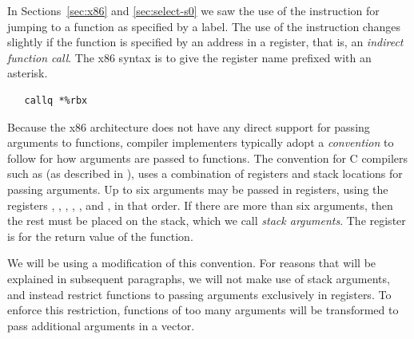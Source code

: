 \documentclass[11pt]{book}
\begin{document}
In Sections~\ref{sec:x86} and \ref{sec:select-s0} we saw the use of
the  instruction for jumping to a function as specified by
a label. The use of the instruction changes slightly if the function
is specified by an address in a register, that is, an \emph{indirect
  function call}. The x86 syntax is to give the register name prefixed
with an asterisk.
\begin{lstlisting}
   callq *%rbx
\end{lstlisting}

Because the x86 architecture does not have any direct support for
passing arguments to functions, compiler implementers typically adopt
a \emph{convention} to follow for how arguments are passed to
functions. The convention for C compilers such as  (as
described in \cite{Matz:2013aa}), uses a combination of registers and
stack locations for passing arguments. Up to six arguments may be
passed in registers, using the registers , ,
, , , and , in that order.  If
there are more than six arguments, then the rest must be placed on the
stack, which we call \emph{stack arguments}. The register 
is for the return value of the function.

We will be using a modification of this convention. For reasons that
will be explained in subsequent paragraphs, we will not make use of
stack arguments, and instead restrict functions to passing arguments
exclusively in registers. To enforce this restriction, functions of
too many arguments will be transformed to pass additional arguments in
a vector.

\end{document}
